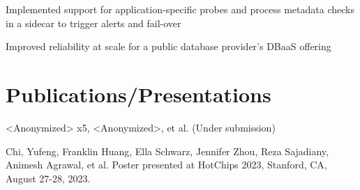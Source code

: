 \documentclass[]{deedy-resume-openfont}
\begin{document}
\begin{minipage}[t]{0.64\textwidth}
\vspace{\topsep}
{\normalsize
\begin{tightemize}
\item Implemented support for application-specific probes and process metadata checks in a sidecar to trigger alerts and fail-over
\item Improved reliability at scale for a public database provider's DBaaS offering
\end{tightemize}
}
\smallsectionsep


\section{Publications/Presentations}
\vspace{\topsep}
\begin{tightemize}
\item <Anonymized> x5, <Anonymized>, et al.  (Under submission)
\item Chi, Yufeng, Franklin Huang, Ella Schwarz, Jennifer Zhou, Reza Sajadiany, Animesh Agrawal, et al. \href{https://hc2023.hotchips.org/assets/program/posters/HC2023.UCBerkeley.YufengChi.Poster.v06.pdf} {} Poster presented at HotChips 2023, Stanford, CA, August 27-28, 2023.
\end{tightemize}
\end{minipage} 
\end{document}
